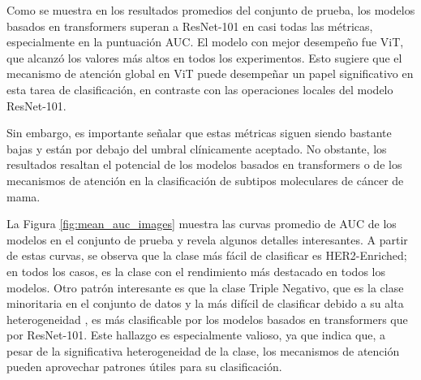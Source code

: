 \documentclass[a4paper,10pt]{book}
\begin{document}
Como se muestra en los resultados promedios del conjunto de prueba, los modelos basados en transformers superan a ResNet-101 en casi todas las métricas, especialmente en la puntuación AUC. El modelo con mejor desempeño fue ViT, que alcanzó los valores más altos en todos los experimentos. Esto sugiere que el mecanismo de atención global en ViT puede desempeñar un papel significativo en esta tarea de clasificación, en contraste con las operaciones locales del modelo ResNet-101.

Sin embargo, es importante señalar que estas métricas siguen siendo bastante bajas y están por debajo del umbral clínicamente aceptado. No obstante, los resultados resaltan el potencial de los modelos basados en transformers o de los mecanismos de atención en la clasificación de subtipos moleculares de cáncer de mama.

La Figura \ref{fig:mean_auc_images} muestra las curvas promedio de AUC de los modelos en el conjunto de prueba y revela algunos detalles interesantes. A partir de estas curvas, se observa que la clase más fácil de clasificar es HER2-Enriched; en todos los casos, es la clase con el rendimiento más destacado en todos los modelos. Otro patrón interesante es que la clase Triple Negativo, que es la clase minoritaria en el conjunto de datos y la más difícil de clasificar debido a su alta heterogeneidad \cite{sinn_triple-negative_2023}, es más clasificable por los modelos basados en transformers que por ResNet-101. Este hallazgo es especialmente valioso, ya que indica que, a pesar de la significativa heterogeneidad de la clase, los mecanismos de atención pueden aprovechar patrones útiles para su clasificación.
\end{document}
